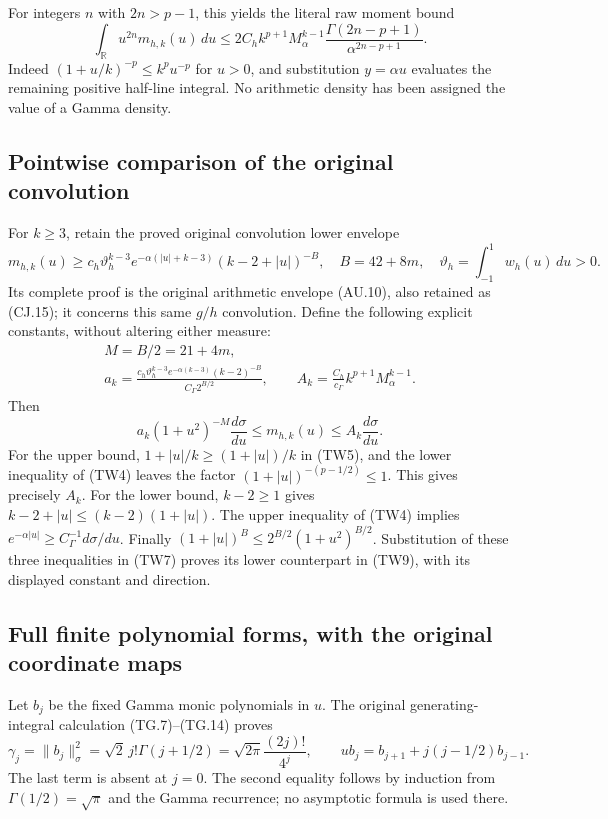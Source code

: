For integers $n$ with $2n>p-1$, this yields the literal raw moment bound
\[
 \int_{\mathbb R}u^{2n}m_{h,k}(u)\,du
 \leq 2C_h k^{p+1}M_\alpha^{k-1}
 \frac{\Gamma(2n-p+1)}{\alpha^{2n-p+1}}.
 \tag{TW6}
\]
Indeed $(1+u/k)^{-p}\leq k^pu^{-p}$ for $u>0$, and substitution
$y=\alpha u$ evaluates the remaining positive half-line integral.
No arithmetic density has been assigned the value of a Gamma density.

\subsection{Pointwise comparison of the original convolution}

For $k\geq3$, retain the proved original convolution lower envelope
\[
 m_{h,k}(u)\geq c_h\vartheta_h^{k-3}
 e^{-\alpha(|u|+k-3)}(k-2+|u|)^{-B},\quad
 B=42+8m,\quad \vartheta_h=\int_{-1}^{1}w_h(u)\,du>0.
 \tag{TW7}
\]
Its complete proof is the original arithmetic envelope (AU.10), also
retained as (CJ.15); it concerns this same $g/h$ convolution.
Define the following explicit constants, without altering either measure:
\[
 \begin{gathered}
 M=B/2=21+4m,\\
 a_k=\frac{c_h\vartheta_h^{k-3}e^{-\alpha(k-3)}(k-2)^{-B}}
 {C_\Gamma 2^{B/2}},\qquad
 A_k=\frac{C_h}{c_\Gamma}k^{p+1}M_\alpha^{k-1}.
 \end{gathered}\tag{TW8}
\]
Then
\[
 \boxed{
 a_k(1+u^2)^{-M}\frac{d\sigma}{du}
 \leq m_{h,k}(u)\leq A_k\frac{d\sigma}{du}.}
 \tag{TW9}
\]
For the upper bound, $1+|u|/k\geq(1+|u|)/k$ in (TW5), and the
lower inequality of (TW4) leaves the factor
$(1+|u|)^{-(p-1/2)}\leq1$.  This gives precisely $A_k$.
For the lower bound, $k-2\geq1$ gives
$k-2+|u|\leq(k-2)(1+|u|)$.  The upper inequality of (TW4) implies
$e^{-\alpha|u|}\geq C_\Gamma^{-1}d\sigma/du$.
Finally $(1+|u|)^B\leq2^{B/2}(1+u^2)^{B/2}$.
Substitution of these three inequalities in (TW7) proves its lower
counterpart in (TW9), with its displayed constant and direction.

\subsection{Full finite polynomial forms, with the original coordinate maps}

Let $b_j$ be the fixed Gamma monic polynomials in $u$.  The original
generating-integral calculation (TG.7)--(TG.14) proves
\[
 \gamma_j=\|b_j\|_\sigma^2
 =\sqrt2\,j!\Gamma(j+1/2)
 =\sqrt{2\pi}\frac{(2j)!}{4^j},\qquad
 u b_j=b_{j+1}+j(j-1/2)b_{j-1}.
 \tag{TW10}
\]
The last term is absent at $j=0$.  The second equality follows by
induction from $\Gamma(1/2)=\sqrt\pi$ and the Gamma recurrence; no
asymptotic formula is used there.

